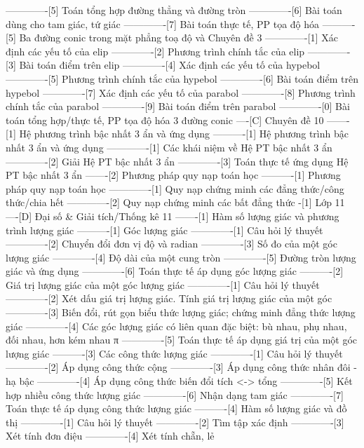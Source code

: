 -------------[5] Toán tổng hợp đường thẳng và đường tròn
-------------[6] Bài toán dùng cho tam giác, tứ giác
-------------[7] Bài toán thực tế, PP tọa độ hóa
----------[5] Ba đường conic trong mặt phẳng toạ độ và Chuyên đề 3
-------------[1] Xác định các yếu tố của elip
-------------[2] Phương trình chính tắc của elip
-------------[3] Bài toán điểm trên elip
-------------[4] Xác định các yếu tố của hypebol
-------------[5] Phương trình chính tắc của hypebol
-------------[6] Bài toán điểm trên hypebol
-------------[7] Xác định các yếu tố của parabol
-------------[8] Phương trình chính tắc của parabol
-------------[9] Bài toán điểm trên parabol
-------------[0] Bài toán tổng hợp/thực tế, PP tọa độ hóa 3 đường conic
----[C] Chuyên đề 10
-------[1] Hệ phương trình bậc nhất 3 ẩn và ứng dụng
----------[1] Hệ phương trình bậc nhất 3 ẩn và ứng dụng
-------------[1] Các khái niệm về Hệ PT bậc nhất 3 ẩn
-------------[2] Giải Hệ PT bậc nhất 3 ẩn
-------------[3] Toán thực tế ứng dụng Hệ PT bậc nhất 3 ẩn
-------[2] Phương pháp quy nạp toán học
----------[1] Phương pháp quy nạp toán học
-------------[1] Quy nạp chứng minh các đẳng thức/công thức/chia hết
-------------[2] Quy nạp chứng minh các bất đẳng thức
-[1] Lớp 11
----[D] Đại số & Giải tích/Thống kê 11
-------[1] Hàm số lượng giác và phương trình lượng giác
----------[1] Góc lượng giác
-------------[1] Câu hỏi lý thuyết
-------------[2] Chuyển đổi đơn vị độ và radian
-------------[3] Số đo của một góc lượng giác
-------------[4] Độ dài của một cung tròn
-------------[5] Đường tròn lượng giác và ứng dụng
-------------[6] Toán thực tế áp dụng góc lượng giác
----------[2] Giá trị lượng giác của một góc lượng giác
-------------[1] Câu hỏi lý thuyết
-------------[2] Xét dấu giá trị lượng giác. Tính giá trị lượng giác của một góc
-------------[3] Biến đổi, rút gọn biểu thức lượng giác; chứng minh đẳng thức lượng giác
-------------[4] Các góc lượng giác có liên quan đặc biệt: bù nhau, phụ nhau, đối nhau, hơn kém nhau π
-------------[5] Toán thực tế áp dụng giá trị của một góc lượng giác
----------[3] Các công thức lượng giác
-------------[1] Câu hỏi lý thuyết
-------------[2] Áp dụng công thức cộng
-------------[3] Áp dụng công thức nhân đôi - hạ bậc
-------------[4] Áp dụng công thức biến đổi tích <-> tổng
-------------[5] Kết hợp nhiều công thức lượng giác
-------------[6] Nhận dạng tam giác
-------------[7] Toán thực tế áp dụng công thức lượng giác
----------[4] Hàm số lượng giác và đồ thị
-------------[1] Câu hỏi lý thuyết
-------------[2] Tìm tập xác định
-------------[3] Xét tính đơn điệu
-------------[4] Xét tính chẵn, lẻ
